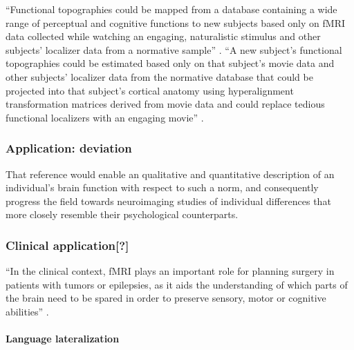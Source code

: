 %
``Functional topographies could be mapped from a database containing a wide
range of perceptual and cognitive functions to new subjects based only on fMRI
data collected while watching an engaging, naturalistic stimulus and other
subjects' localizer data from a normative sample'' \citep{jiahui2020predicting}.
%
``A new subject's functional topographies could be estimated based only on that
subject's movie data and other subjects' localizer data from the normative
database that could be projected into that subject's cortical anatomy using
hyperalignment transformation matrices derived from movie data and could replace
tedious functional localizers with an engaging movie''
\citep{jiahui2020predicting}.




\subsubsection{Application: deviation}


%
That reference would enable an qualitative and quantitative description of an
individual's brain function with respect to such a norm, and consequently
progress the field towards neuroimaging studies of individual differences that
more closely resemble their psychological counterparts.


\subsubsection{Clinical application[?]}






``In the clinical context, fMRI plays an important role for planning surgery in
patients with tumors or epilepsies, as it aids the understanding of which parts
of the brain need to be spared in order to preserve sensory, motor or cognitive
abilities'' \citep{wegrzyn2018thought}.


\paragraph{Language lateralization}

